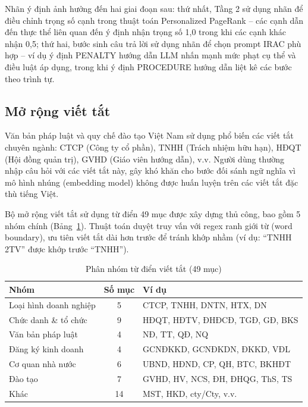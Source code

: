 Nhãn ý định ảnh hưởng đến hai giai đoạn sau: thứ nhất, Tầng 2 sử dụng nhãn để điều chỉnh
trọng số cạnh trong thuật toán Personalized PageRank -- các cạnh dẫn đến thực thể
liên quan đến ý định nhận trọng số 1,0 trong khi các cạnh khác nhận 0,5; thứ hai, bước
sinh câu trả lời sử dụng nhãn để chọn prompt IRAC phù hợp -- ví dụ ý định PENALTY
hướng dẫn LLM nhấn mạnh mức phạt cụ thể và điều luật áp dụng, trong khi ý định
PROCEDURE hướng dẫn liệt kê các bước theo trình tự.

\subsection{Mở rộng viết tắt}
\label{subsec:mo-rong-viet-tat}

Văn bản pháp luật và quy chế đào tạo Việt Nam sử dụng phổ biến các viết tắt chuyên
ngành: CTCP (Công ty cổ phần), TNHH (Trách nhiệm hữu hạn), HĐQT (Hội đồng quản
trị), GVHD (Giáo viên hướng dẫn), v.v. Người dùng thường nhập câu hỏi với các viết
tắt này, gây khó khăn cho bước đối sánh ngữ nghĩa vì mô hình nhúng (embedding model)
không được huấn luyện trên các viết tắt đặc thù tiếng Việt.

Bộ mở rộng viết tắt sử dụng từ điển 49 mục được xây dựng thủ công, bao gồm 5 nhóm
chính (Bảng~\ref{tab:abbreviation-groups}). Thuật toán duyệt truy vấn với regex ranh
giới từ (word boundary), ưu tiên viết tắt dài hơn trước để tránh khớp nhầm (ví dụ:
``TNHH 2TV'' được khớp trước ``TNHH'').

\begin{table}[htbp]
  \centering
  \caption{Phân nhóm từ điển viết tắt (49 mục)}
  \label{tab:abbreviation-groups}
  \begin{tabular}{lcp{7cm}}
    \toprule
    \textbf{Nhóm} & \textbf{Số mục} & \textbf{Ví dụ} \\
    \midrule
    Loại hình doanh nghiệp & 5 & CTCP, TNHH, DNTN, HTX, DN \\
    Chức danh \& tổ chức   & 9 & HĐQT, HĐTV, ĐHĐCĐ, TGĐ, GĐ, BKS \\
    Văn bản pháp luật      & 4 & NĐ, TT, QĐ, NQ \\
    Đăng ký kinh doanh     & 4 & GCNĐKKD, GCNĐKDN, ĐKKD, VĐL \\
    Cơ quan nhà nước        & 6 & UBND, HĐND, CP, QH, BTC, BKHĐT \\
    Đào tạo                & 7 & GVHD, HV, NCS, ĐH, ĐHQG, ThS, TS \\
    Khác                   & 14 & MST, HKD, cty/Cty, v.v. \\
    \bottomrule
  \end{tabular}
\end{table}

